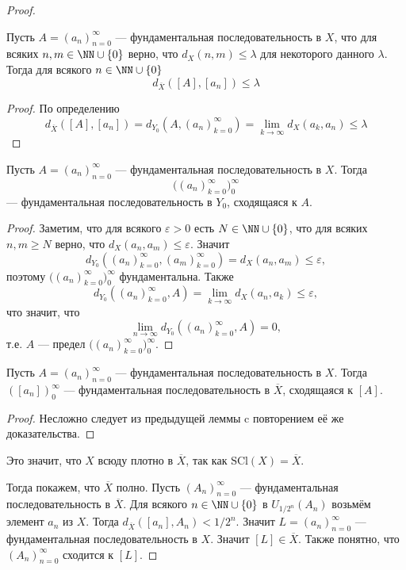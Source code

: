 \documentclass[12pt,a4paper]{article}
\newcommand{\SCl}{\ensuremath{\mathrm{SCl}}\xspace}
\begin{document}
\begin{proof}
        \begin{thlemma}
            Пусть $A = (a_n)_{n=0}^\infty$ --- фундаментальная последовательность в $X$, что для всяких $n, m \in \NN \cup \{0\}$ верно, что $d_X(n, m) \leqslant \lambda$ для некоторого данного $\lambda$. Тогда для всякого $n \in \NN \cup \{0\}$
            \[d_{\overline{X}}([A], [a_n]) \leqslant \lambda\]
        \end{thlemma}

        \begin{proof}
            По определению
            \[d_{\overline{X}}([A], [a_n]) = d_{Y_0}(A, (a_n)_{k=0}^\infty) = \lim_{k \to \infty} d_X(a_k, a_n) \leqslant \lambda\]
        \end{proof}

        \begin{thlemma}
            Пусть $A = (a_n)_{n=0}^\infty$ --- фундаментальная последовательность в $X$. Тогда
            \[\bigl((a_n)_{k=0}^\infty\bigr)_{0}^\infty\]
            --- фундаментальная последовательность в $Y_0$, сходящаяся к $A$.
        \end{thlemma}

        \begin{proof}
            Заметим, что для всякого $\varepsilon > 0$ есть $N \in \NN \cup \{0\}$, что для всяких $n, m \geqslant N$ верно, что $d_X(a_n, a_m) \leqslant \varepsilon$. Значит
            \[d_{Y_0}((a_n)_{k=0}^\infty, (a_m)_{k=0}^\infty) = d_X(a_n, a_m) \leqslant \varepsilon,\]
            поэтому $\bigl((a_n)_{k=0}^\infty\bigr)_{0}^\infty$ фундаментальна. Также
            \[d_{Y_0}((a_n)_{k=0}^\infty, A) = \lim_{k \to \infty} d_X(a_n, a_k) \leqslant \varepsilon,\]
            что значит, что
            \[\lim_{n \to \infty} d_{Y_0}((a_n)_{k=0}^\infty, A) = 0,\]
            т.е. $A$ --- предел $\bigl((a_n)_{k=0}^\infty\bigr)_{0}^\infty$.
        \end{proof}

        \begin{thlemma}
            Пусть $A = (a_n)_{n=0}^\infty$ --- фундаментальная последовательность в $X$. Тогда $([a_n])_{0}^\infty$ --- фундаментальная последовательность в $\overline{X}$, сходящаяся к $[A]$.
        \end{thlemma}

        \begin{proof}
            Несложно следует из предыдущей леммы c повторением её же доказательства.
        \end{proof}

        Это значит, что $X$ всюду плотно в $\overline{X}$, так как $\SCl(X) = \overline{X}$.

        Тогда покажем, что $\overline{X}$ полно. Пусть $(A_n)_{n=0}^\infty$ --- фундаментальная последовательность в $\overline{X}$. Для всякого $n \in \NN \cup \{0\}$ в $U_{1/2^n}(A_n)$ возьмём элемент $a_n$ из $X$. Тогда $d_{\overline{X}}([a_n], A_n) < 1/2^n$. Значит $L = (a_n)_{n=0}^\infty$ --- фундаментальная последовательность в $X$. Значит $[L] \in \overline{X}$. Также понятно, что $(A_n)_{n=0}^\infty$ сходится к $[L]$.
    \end{proof}
\end{document}
